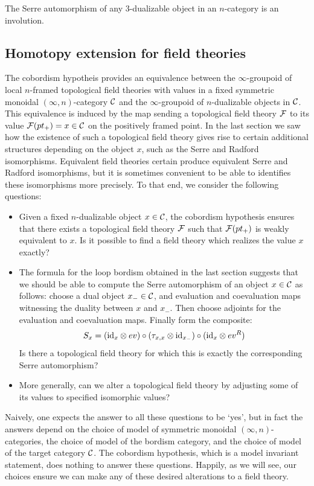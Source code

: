 \documentclass{amsart}
\begin{document}
\begin{proposition}
The Serre automorphism of any $3$-dualizable object in an $n$-category is an involution.
\end{proposition}

\subsection{Homotopy extension for field theories} \label{sec:Hom_ext_field_thy}
The cobordism hypotheis provides an equivalence between the $\infty$-groupoid of local $n$-framed topological field theories with values in a fixed symmetric monoidal $(\infty,n)$-category $\mathcal C$ and the $\infty$-groupoid of $n$-dualizable objects in $\mathcal C$. This equivalence is induced by the map sending a topological field theory $\mathcal F$ to its value $\mathcal F(pt_+) = x \in \mathcal C$ on the positively framed point. In the last section we saw how the existence of such a topological field theory gives rise to certain additional structures depending on the object $x$, such as the Serre and Radford isomorphisms.  Equivalent field theories certain produce equivalent Serre and Radford isomorphisms, but it is sometimes convenient to be able to identifies these isomorphisms more precisely.  To that end, we consider the following questions:
\begin{itemize}
	\item Given a fixed $n$-dualizable object $x \in \mathcal C$, the cobordism hypothesis ensures that 
	there exists a topological field theory $\mathcal F$ such that $\mathcal F(pt_+)$ is weakly equivalent to $x$. Is it possible to find a field theory which realizes the value $x$ exactly? 
	\item The formula for the loop bordism obtained in the last section suggests that we should be able to compute the Serre automorphism of an object $x \in \mathcal C$ as follows: choose a dual object $x_- \in \mathcal C$, and evaluation and coevaluation maps witnessing the duality between $x$ and $x_-$. Then choose adjoints for the evaluation and coevaluation maps. Finally form the composite:
	\begin{equation*}
		S_x = (\mathrm{id}_{x} \otimes ev) \circ (\tau_{x, x} \otimes \mathrm{id}_{x_-}) \circ (\mathrm{id}_{x} \otimes ev^R)
	\end{equation*}
Is there a topological field theory for which this is exactly the corresponding Serre automorphism? 
	\item More generally, can we alter a topological field theory by adjusting some of its values to specified isomorphic values?
\end{itemize}
\nid Naively, one expects the answer to all these questions to be `yes', but in fact the answers depend on the choice of model of symmetric monoidal $(\infty,n)$-categories, the choice of model of the bordism category, and the choice of model of the target category $\mathcal C$.  The cobordism hypothesis, which is a model invariant statement, does nothing to answer these questions.  Happily, as we will see, our choices ensure we can make any of these desired alterations to a field theory.
\end{document}
